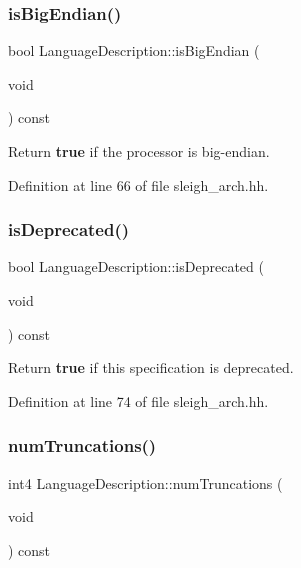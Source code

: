 \subsubsection{\texorpdfstring{isBigEndian()}{isBigEndian()}}
{\footnotesize\ttfamily bool Language\+Description\+::is\+Big\+Endian (\begin{DoxyParamCaption}\item[{void}]{ }\end{DoxyParamCaption}) const\hspace{0.3cm}{\ttfamily [inline]}}



Return {\bfseries{true}} if the processor is big-\/endian. 



Definition at line 66 of file sleigh\+\_\+arch.\+hh.

\mbox{\label{class_language_description_ae9ac918cc9aa1e1327c0996d83179142}} 
\subsubsection{\texorpdfstring{isDeprecated()}{isDeprecated()}}
{\footnotesize\ttfamily bool Language\+Description\+::is\+Deprecated (\begin{DoxyParamCaption}\item[{void}]{ }\end{DoxyParamCaption}) const\hspace{0.3cm}{\ttfamily [inline]}}



Return {\bfseries{true}} if this specification is deprecated. 



Definition at line 74 of file sleigh\+\_\+arch.\+hh.

\mbox{\label{class_language_description_ae8ebd52ceb6c7b018ba49aa6bc536a8b}} 
\subsubsection{\texorpdfstring{numTruncations()}{numTruncations()}}
{\footnotesize\ttfamily int4 Language\+Description\+::num\+Truncations (\begin{DoxyParamCaption}\item[{void}]{ }\end{DoxyParamCaption}) const\hspace{0.3cm}{\ttfamily [inline]}}




